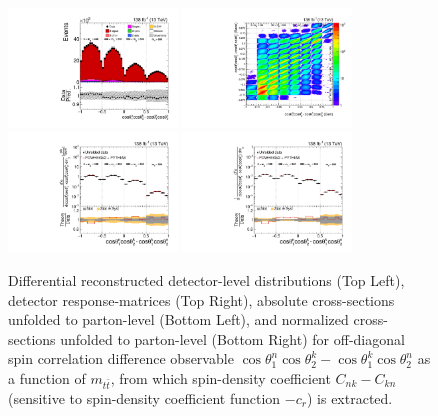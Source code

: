 \clearpage
\begin{figure}[htb]
\begin{center}
 \includegraphics[width=0.40\textwidth]{fig_fullRun2UL/controlplots/combined/Hyp_LLBarCMnk_vs_TTBarMass.pdf}
 \includegraphics[width=0.40\textwidth]{fig_fullRun2UL/unfolding/combined/ResponseMatrix_c_Mnk_mttbar.pdf} \\
 \includegraphics[width=0.40\textwidth]{fig_fullRun2UL/unfolding/combined/UnfoldedResults_c_Mnk_mttbar.pdf}
 \includegraphics[width=0.40\textwidth]{fig_fullRun2UL/unfolding/combined/UnfoldedResultsNorm_c_Mnk_mttbar.pdf} \\
\label{fig:c_Mnk_mttbar}
\caption{Differential reconstructed detector-level distributions (Top Left), detector response-matrices (Top Right), absolute cross-sections unfolded to parton-level (Bottom Left), and normalized cross-sections unfolded to parton-level (Bottom Right) for off-diagonal spin correlation difference observable $\cos\theta_{1}^{n}\cos\theta_{2}^{k}-\cos\theta_{1}^{k}\cos\theta_{2}^{n}$ as a function of $m_{t\bar{t}}$, from which spin-density coefficient $C_{nk}-C_{kn}$ (sensitive to spin-density coefficient function $-c_r$) is extracted.}
\end{center}
\end{figure}

